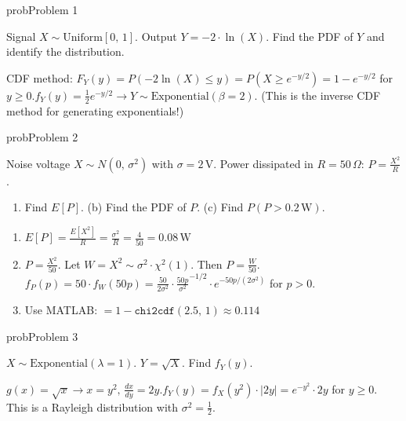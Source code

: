
\begin{PSbox}[unbreakable]{prob}{Problem 1}

Signal $X \sim \mathrm{Uniform}[0,\, 1]$. Output $Y = -2 \cdot \ln (X)$. Find the PDF of $Y$ and identify the distribution.

\PSsolution{} CDF method: $F_{Y}(y) = P(-2\ln (X) \le y) = P(X \ge e^{-y/2}) = 1 - e^{-y/2}$ for $y \ge 0$.\PSbr{}$f_{Y}(y) = \frac{1}{2}e^{-y/2} \to Y \sim \mathrm{Exponential}(\beta = 2)$. (This is the inverse CDF method for generating exponentials!)

\end{PSbox}

\begin{PSbox}[unbreakable]{prob}{Problem 2}

Noise voltage $X \sim N(0,\, \sigma^{2})$ with $\sigma = 2\,\mathrm{V}$. Power dissipated in $R = 50\,\Omega$: $P = \frac{X^{2}}{R}$.

\begin{enumerate}
\def\labelenumi{(\alph{enumi})}
\tightlist
\item
  Find $E[P]$. (b) Find the PDF of $P$. (c) Find $P(P > 0.2\,\mathrm{W})$.
\end{enumerate}

\PSsolution{} 

\begin{enumerate}
\def\labelenumi{(\alph{enumi})}
\tightlist
\item
  $\displaystyle E[P] = \frac{E[X^{2}]}{R} = \frac{\sigma^{2}}{R} = \frac{4}{50} = 0.08\,\mathrm{W}$
\item
  $P = \frac{X^{2}}{50}$. Let $W = X^{2} \sim \sigma^{2} \cdot \chi^{2}(1)$. Then $P = \frac{W}{50}$. $f_{P}(p) = 50 \cdot f_{W}(50p) = \frac{50}{2\sigma^{2}} \cdot \frac{50p}{\sigma^{2}}^{-1/2} \cdot e^{-50p/(2\sigma^{2})}$ for $p > 0$.
\item
  Use MATLAB:  $= 1 - \texttt{chi2cdf}(2.5,\, 1) \approx 0.114$
\end{enumerate}

\end{PSbox}

\begin{PSbox}[unbreakable]{prob}{Problem 3}

$X \sim \mathrm{Exponential}(\lambda = 1)$. $Y = \sqrt{X}$. Find $f_{Y}(y)$.

\PSsolution{} $\displaystyle g(x) = \sqrt{x} \to x = y^{2},\, \frac{dx}{dy} = 2y$.\PSbr{}$f_{Y}(y) = f_{X}(y^{2}) \cdot \lvert 2y\rvert = e^{-y^{2}} \cdot 2y$ for $y \ge 0$. This is a Rayleigh distribution with $\sigma^{2} = \frac{1}{2}$.

\end{PSbox}

